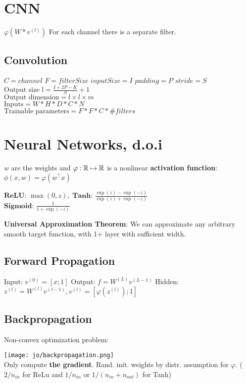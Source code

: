 \section{CNN}
$\varphi(W * v^{(l)})$ 
For each channel there is a separate filter.

\subsection*{Convolution}
    $C = channel$ $F = filterSize$ $inputSize = I$ $padding = P$
    $stride = S$ \\
$ \text{Output size l} = \frac{I + 2P - K}{S} + 1$\\
    $\text{Output dimension} = l \times l \times m $\\
    $\text{Inputs} = W * H * D * C * N $\\
    $\text{Trainable parameters} = F * F * C * \# filters$
\section*{Neural Networks, d.o.i}
$w$ are the weights and $\varphi: \mathbb{R} \mapsto \mathbb{R}$ is a nonlinear \textbf{activation function}: $\phi(x, w) = \varphi(w^\top x)$


$\textbf{ReLU: } \max (0,z), \; \textbf{Tanh: } \frac{\exp(z) - \exp(-z)}{\exp(z) + \exp(-z)}$ \\[-3pt]
$\textbf{Sigmoid: } \frac{1}{1 + \exp(-z)}$


\textbf{Universal Approximation Theorem}: We can approximate any arbitrary smooth target function, with 1+ layer with sufficient width.

\subsection*{Forward Propagation}

Input: $v^{(0)} = [x; 1]$ \quad Output: $f = W^{(L)} v^{(L-1)}$
Hidden: $z^{(l)} = W^{(l)} v^{(l-1)}, v^{(l)} = [\varphi(z^{(l)}); 1]$


\subsection*{Backpropagation}

Non-convex optimization problem: 

\texttt{[image: jo/backpropagation.png]} \\[-10pt]

Only compute \textbf{the gradient}. Rand. init. weights by distr. assumption for $\varphi$. ( $2 / n_{in}$ for ReLu and $1/n_{in}$ or $ 1/ (n_{in} + n_{out})$ for Tanh)

